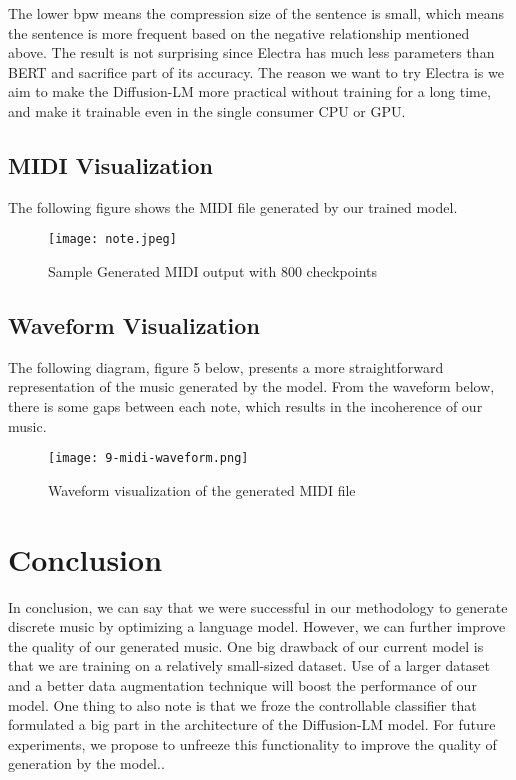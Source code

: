\documentclass{article}
\begin{document}
The lower bpw means the compression size of the sentence is small, which means the sentence is more frequent based on the negative relationship mentioned above. The result is not surprising since Electra has much less parameters than BERT and sacrifice part of its accuracy. The reason we want to try Electra is we aim to make the Diffusion-LM more practical without training for a long time, and make it trainable even in the single consumer CPU or GPU. 

\subsection{MIDI Visualization}

The following figure shows the MIDI file generated by our trained model. 


\begin{figure}[!htb]
   \begin{minipage}{1\textwidth}
     \centering
     \texttt{[image: note.jpeg]}
     \caption{Sample Generated MIDI output with 800 checkpoints}\label{Fig:Data1}
   \end{minipage}\hfill
\end{figure}


\subsection{Waveform Visualization}

The following diagram, figure 5 below, presents a more straightforward representation of the music generated by the model. From the waveform below, there is some gaps between each note, which results in the incoherence of our music.  

\begin{figure}[!htb]
   \begin{minipage}{1\textwidth}
     \centering
     \texttt{[image: 9-midi-waveform.png]}
     \caption{Waveform visualization of the generated MIDI file}\label{Fig:Data1}
   \end{minipage}\hfill
\end{figure}


\section{Conclusion}

In conclusion, we can say that we were successful in our methodology to generate discrete music by optimizing a language model. However, we can further improve the quality of our generated music. One big drawback of our current model is that we are training on a relatively small-sized dataset. Use of a larger dataset and a better data augmentation technique will boost the performance of our model. One thing to also note is that we froze the controllable classifier that formulated a big part in the architecture of the Diffusion-LM model. For future experiments, we propose to unfreeze this functionality to improve the quality of generation by the model.. \\
\end{document}

